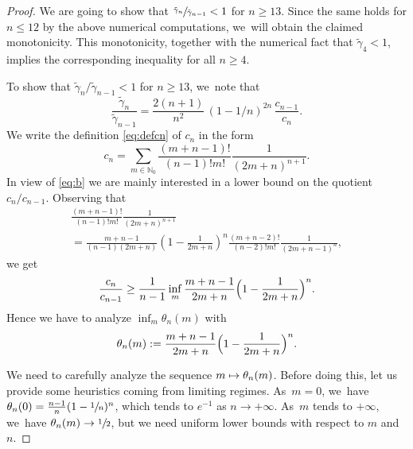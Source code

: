 \documentclass[11pt]{article}
\newcommand\mto{\mathchoice{\longmapsto}{\mapsto}{\mapsto}{\mapsto}}
\let\oldsfrac\sfrac
\renewcommand{\sfrac}[2]{{\oldsfrac{#1}{#2}}}
\theoremstyle{definition}
\newcommand{\1}{\mathbbm{1}}
\newcommand{\N}{\mathbb{N}}
\numberwithin{equation}{section}
\begin{document}
\begin{proof}
We are going to show that $\sfrac{\tilde\gamma_n}{\tilde\gamma_{n-1}}<1$ for $n\geq 13$. Since the same holds for $n\leq 12$ by the above numerical computations, we~will obtain the claimed monotonicity. This monotonicity, together with the numerical fact that $\tilde\gamma_4<1$, implies the corresponding inequality for all $n\geq 4$.

To show that $\tilde\gamma_n/\tilde\gamma_{n-1} <1$ for $n\geq 13$, we~note that
\begin{equation} \label{eq:b}
\frac{\tilde\gamma_n}{\tilde\gamma_{n-1}} = \frac{2(n+1)}{n^2} \,(1-1/n)^{2n} \,\frac{c_{n-1}}{c_n}.
\end{equation}
We write the definition \eqref{eq:defcn} of $c_n$ in the form
\[
c_n= \sum_{m\in\N_0} \frac{ (m+n-1)! }{(n-1)! m!} \frac{1}{(2m+n)^{n+1}}.
\]
In view of \eqref{eq:b} we are mainly interested in a lower bound on the quotient $c_n/c_{n-1}$. Observing that
\begin{multline*}
\frac{ (m+n-1)! }{(n-1)! m!} \frac{1}{(2m+n)^{n+1}}\\
= \frac{m+n-1}{(n-1)(2m+n)} (1- \frac{1}{2m+n})^n \frac{ (m+n-2)! }{(n-2)! m!} \frac{1}{(2m+n-1)^{n}},
\end{multline*}
we get
\begin{equation}\label{eq:a}
\frac{c_n}{c_{n-1}} \geq \frac{1}{n-1} \inf_m \frac{m+n-1}{2m+n} \Bigl(1- \frac{1}{2m+n}\Bigr)^n.
\end{equation}
Hence we have to analyze $\inf_m \theta_n(m)$ with
\begin{equation}\label{eq:theta}
\theta_n(m):= \frac{m+n-1}{2m+n} \Bigl(1- \frac{1}{2m+n}\Bigr)^n.
\end{equation}

We need to carefully analyze the sequence $m \mto \theta_n(m)$. Before doing this, let us provide some heuristics coming from limiting regimes. As~$m=0$, we~have \hbox{$\theta_n(0)=\frac{n-1}{n}(1- \sfrac{1}{n})^n$}, which tends to $e^{-1}$ as $n\to +\infty$. As~$m$ tends to $+\infty$, we~have $\theta_n(m)\to\nobreak\sfrac 12$, but we need uniform lower bounds with respect to $m$ and $n$.


\end{proof}
\end{document}

